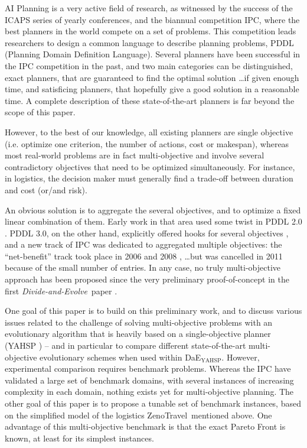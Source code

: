 \documentclass[a4paper,10pt]{article}
\def\dae{{\em Divide-and-Evolve}}
\def\DAEYAHSP{{\sc DaE$_{\text{YAHSP}}$}}
\def\ZENO{{\sc ZenoTravel}}
\begin{document}
AI Planning is a very active field of research, as witnessed by the success of the ICAPS series of yearly conferences, and the biannual competition IPC, where the best planners in the world compete on a set of problems. This competition leads researchers to design a common language to describe planning problems, PDDL (Planning Domain Definition Language). Several planners have been successful in the IPC competition in the past, and two main categories can be distinguished, exact planners, that are guaranteed to find the optimal solution \ldots if given enough time, and satisficing planners, that hopefully give a good solution in a reasonable time. A complete description of these state-of-the-art planners is far beyond the scope of this paper. 

However, to the best of our knowledge, all existing planners are single objective (i.e. optimize one criterion, the number of actions, cost or makespan), whereas most real-world problems are in fact multi-objective and involve several contradictory objectives that need to be optimized simultaneously. For instance, in logistics, the decision maker must generally find a trade-off between duration and cost (or/and risk). 

An obvious solution is to aggregate the several objectives, and to optimize a fixed linear combination of them. Early work in that area used some twist in PDDL 2.0 \cite{do2003sapa,refanidis2003multiobjective,gerevini2008}. PDDL 3.0, on the other hand, explicitly offered hooks for several objectives \cite{gerevini2006preferences}, and a new track of IPC was dedicated to aggregated multiple objectives: the ``net-benefit'' track took place in 2006 \cite{chen2006temporal} and 2008 \cite{edelkamp2009optimal}, \ldots but was cancelled in 2011 because of the small number of entries.
In any case, no truly multi-objective approach has been proposed since the very preliminary proof-of-concept in the first \dae\ paper \cite{Schoenauer2006}. 

One goal of this paper is to build on this preliminary work, and to discuss various issues related to the challenge of solving multi-objective problems with an evolutionary algorithm that is heavily based on a single-objective planner (YAHSP \cite{Vidal2004}) -- and in particular to compare different state-of-the-art multi-objective evolutionary schemes when used within \DAEYAHSP.
However, experimental comparison requires benchmark problems. Whereas the IPC have validated a large set of benchmark domains, with several instances of increasing complexity in each domain, nothing exists yet for multi-objective planning. The other goal of this paper is to propose a tunable set of benchmark instances, based on the simplified model of the logistics \ZENO\ mentioned above. One advantage of this multi-objective benchmark is that the exact Pareto Front is known, at least for its simplest instances.
 
\end{document}
